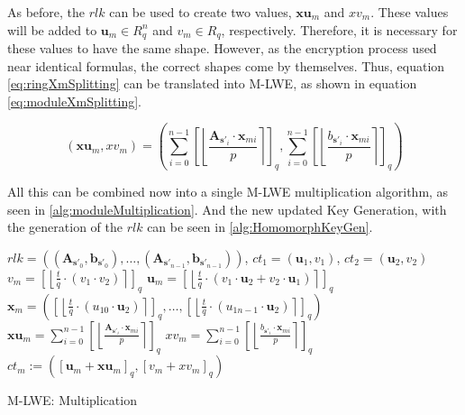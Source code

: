 As before, the $rlk$ can be used to create two values, $\textbf{xu}_m$ and $xv_m$. These values will be added to $\textbf{u}_m \in R^n_q$ and $v_m \in R_q$, respectively. Therefore, it is necessary for these values to have the same shape. However, as the encryption process used near identical formulas, the correct shapes come by themselves. Thus, equation \ref{eq:ringXmSplitting} can be translated into M-LWE, as shown in equation \ref{eq:moduleXmSplitting}. 

\begin{equation}
  (\textbf{xu}_m, xv_m) = \left(\sum_{i=0}^{n-1}\left[\left\lfloor\frac{\textbf{A}_{\textbf{s}'_i} \cdot \textbf{x}_{mi}}{p}  \right\rceil \right]_q, \sum_{i=0}^{n-1}\left[\left\lfloor \frac{b_{\textbf{s}'_i} \cdot \textbf{x}_{mi}}{p}  \right\rceil \right]_q\right)
  \label{eq:moduleXmSplitting}
\end{equation}

All this can be combined now into a single M-LWE multiplication algorithm, as seen in \ref{alg:moduleMultiplication}. And the new updated Key Generation, with the generation of the $rlk$ can be seen in \ref{alg:HomomorphKeyGen}.

\begin{algorithm}[htb]
  \begin{algorithmic}[1]
    \REQUIRE $rlk=((\textbf{A}_{\textbf{s}'_0}, \textbf{b}_{\textbf{s}'_0}), \ldots ,(\textbf{A}_{\textbf{s}'_{n-1}}, \textbf{b}_{\textbf{s}'_{n-1}}))$, $ct_1 = (\textbf{u}_1, v_1)$, $ct_2 = (\textbf{u}_2, v_2)$
    \STATE $v_m = \left[\left\lfloor \frac{t}{q}\cdot (v_1 \cdot v_2)\right\rceil\right] _q $
    \STATE $\textbf{u}_m = \left[\left\lfloor \frac{t}{q}\cdot(v_1 \cdot \textbf{u}_2 + v_2 \cdot \textbf{u}_1)\right\rceil\right] _q$
    \STATE $\textbf{x}_m = \left(\left[\left\lfloor \frac{t}{q}\cdot(u_{10} \cdot \textbf{u}_2)\right\rceil\right]_q,\ldots, \left[\left\lfloor \frac{t}{q}\cdot(u_{1n-1} \cdot \textbf{u}_2)\right\rceil\right]_q\right) $
    \STATE $\textbf{xu}_m = \sum_{i=0}^{n-1}\left[\left\lfloor\frac{\textbf{A}_{\textbf{s}'_i} \cdot \textbf{x}_{mi}}{p}  \right\rceil \right]_q$
    \STATE $xv_m = \sum_{i=0}^{n-1}\left[\left\lfloor \frac{b_{\textbf{s}'_i} \cdot \textbf{x}_{mi}}{p}  \right\rceil \right]_q$
    \RETURN $ct_m:=(\left[\textbf{u}_m + \textbf{xu}_m\right]_q , \left[v_m + xv_m\right]_q )$
  \end{algorithmic}
  \caption{M-LWE: Multiplication}
  \label{alg:moduleMultiplication}
\end{algorithm}


